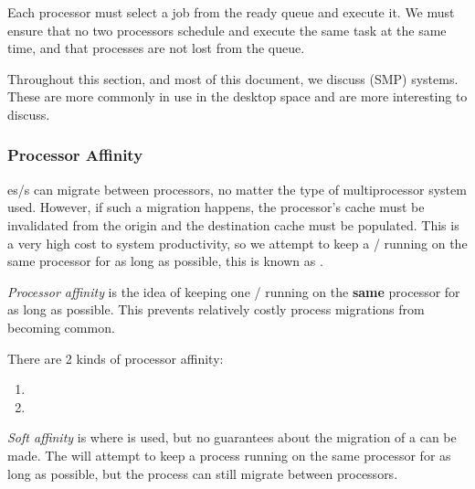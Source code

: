 Each processor must select a job from the ready queue and execute it.
We must ensure that no two processors schedule and execute the same task at the same time, and that processes are not lost from the queue.

\begin{blackbox}
  Throughout this section, and most of this document, we discuss  (SMP) systems.
  These are more commonly in use in the desktop space and are more interesting to discuss.
\end{blackbox}

\subsubsection{Processor Affinity}\label{subsubsec:Processor_Affinity}
es/s can migrate between processors, no matter the type of multiprocessor system used.
However, if such a migration happens, the processor's cache must be invalidated from the origin and the destination cache must be populated.
This is a very high cost to system productivity, so we attempt to keep a / running on the same processor for as long as possible, this is known as .

\begin{definition}\label{def:Processor_Affinity}
  \emph{Processor affinity} is the idea of keeping one / running on the \textbf{same} processor for as long as possible.
  This prevents relatively costly process migrations from becoming common.

  There are 2 kinds of processor affinity:
  \begin{enumerate}[noitemsep]
  \item {}
  \item {}
  \end{enumerate}
\end{definition}

\begin{definition}\label{def:Soft_Affinity}
  \emph{Soft affinity} is where  is used, but no guarantees about the migration of a  can be made.
  The  will attempt to keep a process running on the same processor for as long as possible, but the process can still migrate between processors.
\end{definition}

